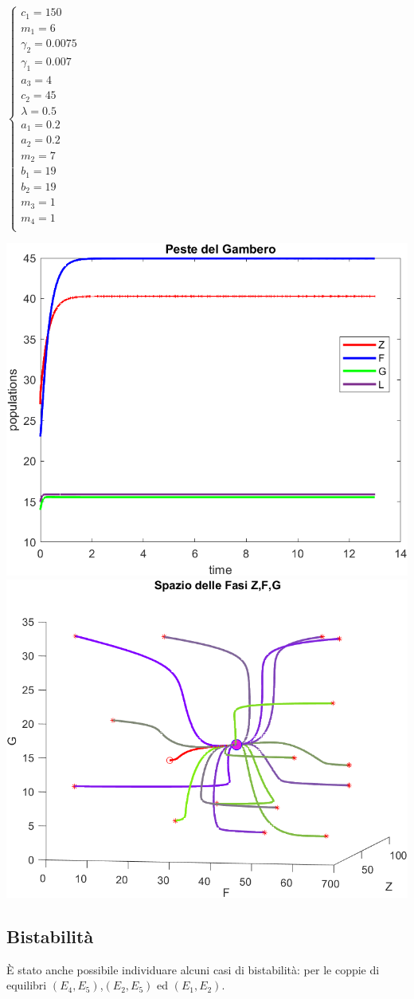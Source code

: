 \documentclass[12pt,a4paper]{article}
\numberwithin{theorem}{section}
\numberwithin{definition}{section}
\numberwithin{example}{section}
\begin{document}
\begin{minipage}{0.2\textwidth}
    $\begin{cases}
	c_1=150\\
	m_1=6\\
	\gamma_2=0.0075\\
	\gamma_1=0.007\\
	a_3=4\\
	c_2=45\\
	\lambda=0.5\\ %
	a_1=0.2\\
	a_2=0.2\\
	m_2=7\\
	b_1=19\\
	b_2=19\\
	m_3=1\\
	m_4=1\\ 
\end{cases}$
\end{minipage}
\begin{minipage}{0.7\textwidth}
    \centering
    \includegraphics[width=6 cm]{grafici/E6_fasi.png} 
    \\
    \includegraphics[width=6 cm]{grafici/E6_ritratto.png}
\end{minipage}

\newpage
\subsection{Bistabilità}
È stato anche possibile individuare alcuni casi di bistabilità: per le coppie di equilibri $(E_4,E_5)$,$(E_2,E_5)$ ed $(E_1,E_2)$.
\end{document}
